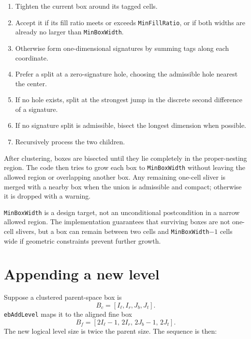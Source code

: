\documentclass[11pt,oneside,openany]{book}
\newcommand{\code}[1]{\textnormal{\texttt{#1}}}
\begin{document}
\begin{enumerate}[label=\arabic*.]
\item Tighten the current box around its tagged cells.
\item Accept it if its fill ratio meets or exceeds \code{MinFillRatio}, or if both widths are already no larger than \code{MinBoxWidth}.
\item Otherwise form one-dimensional signatures by summing tags along each coordinate.
\item Prefer a split at a zero-signature hole, choosing the admissible hole nearest the center.
\item If no hole exists, split at the strongest jump in the discrete second difference of a signature.
\item If no signature split is admissible, bisect the longest dimension when possible.
\item Recursively process the two children.
\end{enumerate}

After clustering, boxes are bisected until they lie completely in the proper-nesting region. The code then tries to grow each box to \code{MinBoxWidth} without leaving the allowed region or overlapping another box. Any remaining one-cell sliver is merged with a nearby box when the union is admissible and compact; otherwise it is dropped with a warning.

\begin{cautionbox}
\code{MinBoxWidth} is a design target, not an unconditional postcondition in a narrow allowed region. The implementation guarantees that surviving boxes are not one-cell slivers, but a box can remain between two cells and \code{MinBoxWidth}$-1$ cells wide if geometric constraints prevent further growth.
\end{cautionbox}

\section{Appending a new level}
Suppose a clustered parent-space box is
\[
 B_c=[I_\ell,I_r,J_b,J_t].
\]
\code{ebAddLevel} maps it to the aligned fine box
\begin{equation}
 B_f=[2I_\ell-1,\,2I_r,\,2J_b-1,\,2J_t].
 \label{eq:boxrefine}
\end{equation}
The new logical level size is twice the parent size. The sequence is then:
\end{document}
